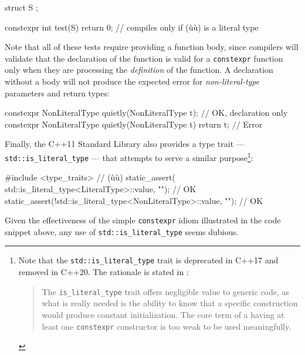 \begin{enumerate}
{%
\begin{emcppshiddenlisting}[emcppsbatch=t1]
struct S {};
\end{emcppshiddenlisting}
\begin{emcppslisting}[emcppsbatch=t1]
constexpr int test(S) { return 0; }  // compiles only if (ù{}ù) is a literal type
\end{emcppslisting}


\noindent Note that all of these tests require providing a function body, since
compilers will validate that the declaration of the function is valid
for a \lstinline!constexpr! function only when they are processing the
\emph{definition} of the function. A declaration without a body will not
produce the expected error for \emph{non-literal-type} parameters and
return types:

\begin{emcppslisting}[emcppsbatch=e9]
constexpr NonLiteralType quietly(NonLiteralType t);  // OK, declaration only
constexpr NonLiteralType quietly(NonLiteralType t) { return t; }  // Error
\end{emcppslisting}


\noindent Finally, the C++11 Standard Library also provides a type trait ---
\lstinline!std::is_literal_type! --- that attempts to serve a similar
purpose{\cprotect\footnote{Note that the \lstinline!std::is_literal_type!
trait is deprecated in C++17 and removed in C++20. The rationale is
  stated in \cite{meredith16}:

  \begin{quote}
  The \lstinline!is_literal_type! trait offers negligible value to
  generic code, as what is really needed is the ability to know that a
  specific construction would produce constant initialization. The core
  term of a  having at least one \lstinline!constexpr!
  constructor is too weak to be used meaningfully.
  \end{quote}}}:

\begin{emcppslisting}[emcppsbatch=e9]
#include <type_traits>  // (ù{}ù)
static_assert( std::is_literal_type<LiteralType>::value, "");     // OK
static_assert(!std::is_literal_type<NonLiteralType>::value, "");  // OK
\end{emcppslisting}


\noindent Given the effectiveness of the simple \lstinline!constexpr!
 idiom illustrated in the code snippet above, any
use of \lstinline!std::is_literal_type! seems dubious.

}
\end{enumerate}
